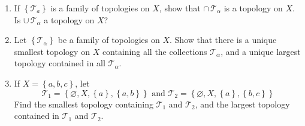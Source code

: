 \documentclass[12pt]{article}
\newenvironment{problem}[2][Exercise]{\begin{trivlist}
\item[\hskip \labelsep {\bfseries #1}\hskip \labelsep {\bfseries #2.}]}{\end{trivlist}}
\begin{document}
\begin{problem}{13.4}
\begin{enumerate}[label=(\alph*)]
	\item If $\left\{\mathcal{T}_a\right\}$ is a family of topologies on $X$, show that $\cap \,\mathcal{T}_{\alpha}$ is a topology on $X$. Is $\cup\, \mathcal{T}_{\alpha}$ a topology on $X$?
	\item Let $\left\{\mathcal{T}_{\alpha}\right\}$ be a family of topologies on $X$. Show that there is a unique smallest topology on $X$ containing all the collections $\mathcal{T}_{\alpha}$, and a unique largest topology contained in all $\mathcal{T}_{\alpha}$.
	\item If $X=\left\{a,b,c\right\}$, let $$ \mathcal{T}_1=\left\{\varnothing, X, \left\{a\right\},\left\{a,b\right\}\right\} \text{   and   } \mathcal{T}_2=\left\{\varnothing, X, \left\{a\right\},\left\{b,c\right\}\right\}$$ Find the smallest topology containing $\mathcal{T}_1$ and $\mathcal{T}_2$, and the largest topology contained in $\mathcal{T}_1$ and $\mathcal{T}_2$.
\end{enumerate}
\end{problem}
\end{document}
